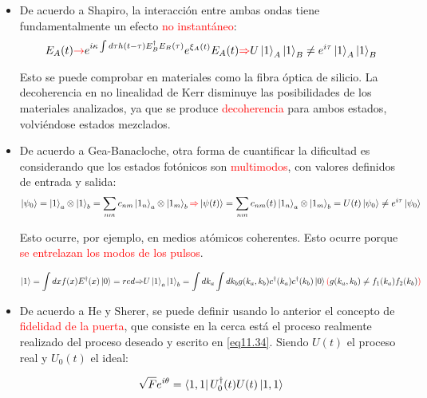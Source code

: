 \documentclass{book}
\begin{document}
\begin{itemize}
    \item De acuerdo a Shapiro, la interacción entre ambas ondas tiene fundamentalmente un efecto \textcolor{red}{no instantáneo}:
    \begin{equation}\label{eq11.36}E_A(t)\textcolor{red}{\rightarrow}e^{i\kappa\int d\tau h(t-\tau)E_B^\dag E_B(\tau)}e^{\xi_A(t)}E_A(t)\textcolor{red}{\Rightarrow}U\ket{1}_A\ket{1}_B\neq e^{i\tau}\ket{1}_A\ket{1}_B\end{equation}
    
    Esto se puede comprobar en materiales como la fibra óptica de silicio. La decoherencia en no linealidad de Kerr disminuye las posibilidades de los materiales analizados, ya que se produce \textcolor{red}{decoherencia} para ambos estados, volviéndose estados mezclados.
    \item De acuerdo a Gea-Banacloche, otra forma de cuantificar la dificultad es considerando que los estados fotónicos son \textcolor{red}{multimodos}, con valores definidos de entrada y salida:
    \begin{equation}\label{eq11.37}\ket{\psi_0}=\ket{1}_a\otimes\ket{1}_b=\sum_{nm} c_{nm}\ket{1_n}_a\otimes\ket{1_m}_b\textcolor{red}{\Rightarrow}\ket{\psi(t)}=\sum_{nm} c_{nm}(t)\ket{1_n}_a\otimes\ket{1_m}_b=U(t)\ket{\psi_0}\neq e^{i\tau}\ket{\psi_0}\end{equation}
    
    Esto ocurre, por ejemplo, en medios atómicos coherentes. Esto ocurre porque \textcolor{red}{se entrelazan los modos de los pulsos}.
    
    \begin{equation}\label{eq11.38}\ket{1}=\int dx f(x)E^\dag(x)\ket{0}={red}{\Rightarrow}U\ket{1}_a\ket{1}_b=\int dk_a\int dk_b g(k_a,k_b)c^\dag(k_a)c^\dag (k_b)\ket{0} \textcolor{red}{(}g(k_a,k_b)\neq f_1(k_a)f_2(k_b)\textcolor{red}{)}\end{equation}
    \item De acuerdo a He y Sherer, se puede definir usando lo anterior el concepto de \textcolor{red}{fidelidad de la puerta}, que consiste en la cerca está el proceso realmente realizado del proceso deseado y escrito en \ref{eq11.34}. Siendo $U(t)$ el proceso real y $U_0(t)$ el ideal:
    
    \begin{equation}\label{eq11.39}\sqrt{F}e^{i\theta}=\bra{1,1}U_0^\dag(t)U(t)\ket{1,1}\end{equation}
\end{itemize}
\end{document}
